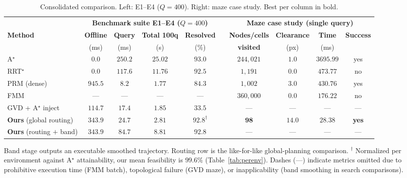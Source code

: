 \documentclass[conference]{IEEEtran}
\begin{document}
\begin{table}[htbp]
\caption{Consolidated comparison. Left: E1--E4 ($Q=400$). Right: maze case study. Best per column in bold.}
\label{tab:master}
\begin{center}
\begin{tabular}{@{}l cccc c cccc@{}}
\toprule
& \multicolumn{4}{c}{\textbf{Benchmark suite E1--E4 ($Q=400$)}} & & \multicolumn{4}{c}{\textbf{Maze case study (single query)}} \\
\cmidrule(lr){2-5} \cmidrule(lr){7-10}
\textbf{Method} & \textbf{Offline} & \textbf{Query} & \textbf{Total 100q} & \textbf{Resolved} & & \textbf{Nodes/cells} & \textbf{Clearance} & \textbf{Time} & \textbf{Success} \\
 & (ms) & (ms) & (s) & (\%) & & \textbf{visited} & (px) & (ms) & \\ \midrule
A$^\star$~\cite{hart1968}              & $\mathbf{0.0}$ & $250.2$ & $25.02$ & $\mathbf{93.0}$ & & $244{,}021$ & $1.0$ & $3695.99$ & yes \\
RRT$^\star$~\cite{karaman2011}         & $\mathbf{0.0}$ & $117.6$ & $11.76$ & $92.5$ & & $1{,}191$ & $0.0$ & $473.77$ & no \\
PRM (dense)~\cite{kavraki1996}         & $945.5$ & $\mathbf{8.2}$ & $1.77$ & $84.3$ & & $1{,}002$ & $3.0$ & $430.76$ & yes \\
FMM                                    & --- & --- & --- & --- & & $360{,}000$ & $0.0$ & $176.22$ & no \\
GVD + A$^\star$ inject                 & $114.7$ & $17.4$ & $1.85$ & $33.5$ & & --- & --- & --- & --- \\ \midrule
\textbf{Ours} (global routing)      & $343.9$ & $24.7$ & $\mathbf{2.81}$ & $92.8^{\dagger}$ & & $\mathbf{98}$ & $\mathbf{14.0}$ & $\mathbf{28.38}$ & \textbf{yes} \\
\textbf{Ours} (routing $+$ band)       & $343.9$ & $84.7$ & $8.81$ & $92.8$ & & --- & --- & --- & --- \\ \bottomrule
\end{tabular}
\end{center}
\footnotesize Band stage outputs an executable smoothed trajectory. Routing row is the like-for-like global-planning comparison. $^{\dagger}$ Normalized per environment against A$^\star$ attainability, our mean feasibility is $99.6\%$ (Table~\ref{tab:perenv}). Dashes (---) indicate metrics omitted due to prohibitive execution time (FMM batch), topological failure (GVD maze), or inapplicability (band smoothing in search comparisons).
\end{table}
\end{document}
